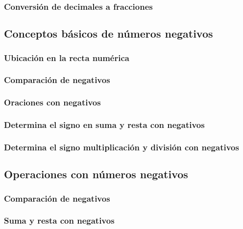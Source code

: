 \documentclass[12pt,addpoints]{evalua3}
\begin{document}
\begin{questions}
	\subsubsection{Conversión de decimales a fracciones}
	\question{}

	\subsection   {Conceptos básicos de números negativos}
	\subsubsection{Ubicación en la recta numérica}
	\question{}
	\subsubsection{Comparación de negativos}
	\question{}
	\subsubsection{Oraciones con negativos}
	\question{}
	\subsubsection{Determina el signo en suma y resta con negativos}
	\question{}
	\subsubsection{Determina el signo multiplicación y división con negativos}
	\question{}

	\subsection   {Operaciones con números negativos}
	\subsubsection{Comparación de negativos}
	\question{}
	\subsubsection{Suma y resta con negativos}
	\question{}

\end{questions}
\end{document}
